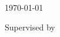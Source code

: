 \begin{titlepage}
    \begin{center}        
        \LARGE
        \myTitle

        \vspace{0.4cm}

        \large
        \myAuthor\\
        \today
        
        \vspace{0.4cm}
        \large
        Supervised by\\
        \myAdvisorShort

        \vspace{0.6cm}
        \begin{minipage}{0.8\textwidth}
            \small
            \myAbstract
        \end{minipage}
        
        \vfill
        \small
        \myInstitution        
    \end{center}
  \end{titlepage}